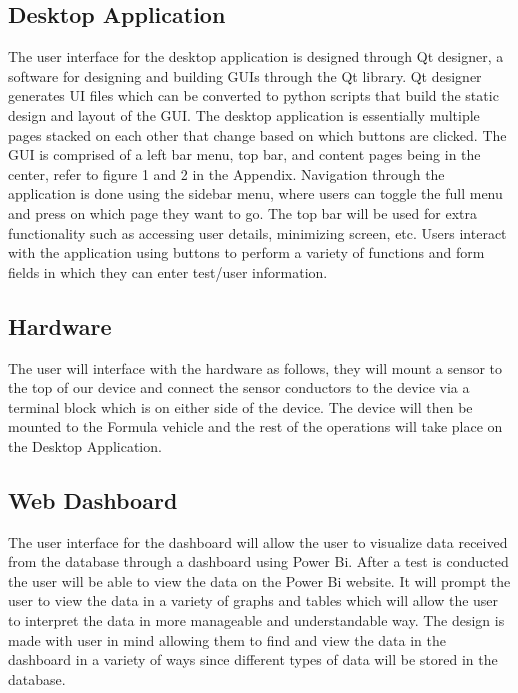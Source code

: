 \documentclass[12pt, titlepage]{article}
\begin{document}
\subsection{Desktop Application}
The user interface for the desktop application is designed through Qt designer, a software for designing and building GUIs through the Qt library. Qt designer generates UI files which can be converted to python scripts that build the static design and layout of the GUI. The desktop application is essentially multiple pages stacked on each other that change based on which buttons are clicked. The GUI is comprised of a left bar menu, top bar, and content pages being in the center, refer to figure 1 and 2 in the Appendix. Navigation through the application is done using the sidebar menu, where users can toggle the full menu and press on which page they want to go. The top bar will be used for extra functionality such as accessing user details, minimizing screen, etc. Users interact with the application using buttons to perform a variety of functions and form fields in which they can enter test/user information.

\subsection{Hardware}
The user will interface with the hardware as follows, they will mount a sensor to the top of our device and connect the sensor conductors to the device via a terminal block which is on either side of the device. The device will then be mounted to the Formula vehicle and the rest of the operations will take place on the Desktop Application.
\newpage
\subsection{Web Dashboard}
The user interface for the dashboard will allow the user to visualize data received from the database through a dashboard using Power Bi. After a test is conducted the user will be able to view the data on the Power Bi website. It will prompt the user to view the data in a variety of graphs and tables which will allow the user to interpret the data in more manageable and understandable way. The design is made with user in mind allowing them to find and view the data in the dashboard in a variety of ways since different types of data will be stored in the database.



\end{document}
